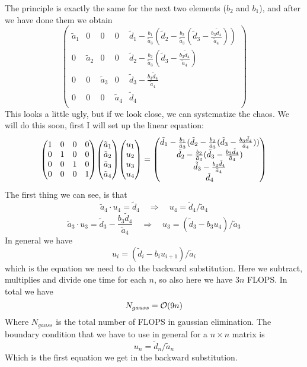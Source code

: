 \documentclass{scrartcl}
\begin{document}
The principle is exactly the same for the next two elements ($b_2$ and $b_1$), and after we have done them we obtain
\[
 \left(
  \begin{array}{cccc|c}
   \tilde{a}_1 & 0 & 0 & 0 & \tilde{d}_1-\frac{b_1}{\tilde{a}_3}(\tilde{d}_2-\frac{b_2}{\tilde{a}_3}(\tilde{d}_3-\frac{b_3\tilde{d}_4}{\tilde{a}_4})) \\
   0 & \tilde{a}_2 & 0 & 0 & \tilde{d}_2-\frac{b_2}{\tilde{a}_3}(\tilde{d}_3-\frac{b_3\tilde{d}_4}{\tilde{a}_4}) \\
   0 & 0 & \tilde{a}_3 & 0 & \tilde{d}_3-\frac{b_3\tilde{d}_4}{\tilde{a}_4} \\
   0 & 0 & 0 & \tilde{a}_4 & \tilde{d}_4 \\
  \end{array}
 \right)
\]
This looks a little ugly, but if we look close, we can systematize the chaos. We will do this soon, first I  will set up the linear equation:
\begin{equation*}
\mqty(1&0&0&0\\0&1&0&0\\0&0&1&0\\0&0&0&1)
\mqty(\tilde{a}_1\\\tilde{a}_2\\\tilde{a}_3\\\tilde{a}_4)
\mqty(u_1\\u_2\\u_3\\u_4)=
\mqty(\tilde{d}_1-\frac{b_1}{\tilde{a}_3}(\tilde{d}_2-\frac{b_2}{\tilde{a}_3}				  	 (\tilde{d}_3-\frac{b_3\tilde{d}_4}{\tilde{a}_4}))\\
	 \tilde{d}_2-\frac{b_2}{\tilde{a}_3}(\tilde{d}_3-\frac{b_3\tilde{d}_4}{\tilde{a}_4})\\
	 \tilde{d}_3-\frac{b_3\tilde{d}_4}{\tilde{a}_4}\\
	 \tilde{d}_4)
\end{equation*}
The first thing we can see, is that
$$\tilde{a}_4\cdot u_4=\tilde{d}_4\quad\Rightarrow\quad u_4=\tilde{d}_4/\tilde{a}_4$$
$$\tilde{a}_3\cdot u_3=\tilde{d}_3-\frac{b_3\tilde{d}_4}{\tilde{a}_4}\quad\Rightarrow\quad u_3=(\tilde{d}_3-b_3u_4)/\tilde{a}_3$$
In general we have
\begin{equation}
u_i=(\tilde{d}_i-b_iu_{i+1})/\tilde{a}_i
\end{equation}
which is the equation we need to do the backward substitution. Here we subtract, multiplies and divide one time for each $n$, so also here we have $3n$ FLOPS. In total we have 
$$N_{gauss}={\cal O}(9n)$$
Where $N_{gauss}$ is the total number of FLOPS in gaussian elimination.
The boundary condition that we have to use in general for a $n\times n$ matrix is
\begin{equation}
u_n=\tilde{d}_n/\tilde{a}_n
\end{equation}
Which is the first equation we get in the backward substitution. 
\end{document}
